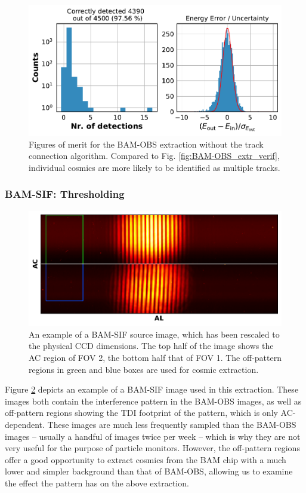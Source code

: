 \documentclass[a4paper, 11pt]{article}
\begin{document}
\begin{figure}
  \centering
    \includegraphics[width=\textwidth]{images/extraction/verification_bam-obs_old}
    \caption{Figures of merit for the BAM-OBS extraction without the track connection algorithm. Compared to Fig. \ref{fig:BAM-OBS_extr_verif}, individual cosmics are more likely to be identified as multiple tracks.}
  \label{fig:BAM-OBS_nomend_extr_verif}
\end{figure}


\subsubsection{BAM-SIF: Thresholding}
\label{sec:extrBAM-SIF}
\begin{figure}
  \centering
  \includegraphics{images/extraction/BAM-SIF_full_image}
  \caption{An example of a BAM-SIF source image, which has been rescaled to the physical CCD dimensions. The top half of the image shows the AC region of FOV 2, the bottom half that of FOV 1. The off-pattern regions in green and blue boxes are used for cosmic extraction.}
  \label{fig:BAM-SIF_full}
\end{figure}

Figure \ref{fig:BAM-SIF_full} depicts an example of a BAM-SIF image used in this extraction. These images both contain the interference pattern in the BAM-OBS images, as well as off-pattern regions showing the TDI footprint of the pattern, which is only AC-dependent. These images are much less frequently sampled than the BAM-OBS images -- usually a handful of images twice per week -- which is why they are not very useful for the purpose of particle monitors. However, the off-pattern regions offer a good opportunity to extract cosmics from the BAM chip with a much lower and simpler background than that of BAM-OBS, allowing us to examine the effect the pattern has on the above extraction.
\end{document}
